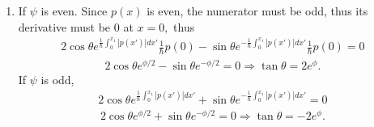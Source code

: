 \begin{enumerate}
    For $x<x_1,$ use the large approximation
    \begin{align*}
        \psi(x)=
        \frac{a}{2\sqrt{\pi}(\alpha(x-x_1))^{1/4}}e^{-\frac{2}{3}(\alpha(x-x_1))^{3/2}}+
        \frac{b}{\sqrt{\pi}(\alpha(x-x_1))^{1/4}}e^{\frac{2}{3}(\alpha(x-x_1))^{3/2}}
    \end{align*}
    \begin{align*}
        \frac{a}{2\sqrt{\pi}(\alpha(x-x_1))^{1/4}} = \frac{A}{\sqrt{\hbar}(-\alpha)^{3/4}(x_1-x)^{1/4}}
        \Rightarrow
        A =\frac{a\sqrt{\hbar}(-\alpha)^{1/2}}{2\sqrt{\pi}}
    \end{align*}
    \begin{align*}
        \frac{b}{\sqrt{\pi}(\alpha(x_1-x))^{1/4}} = \frac{B}{\sqrt{\hbar}(-\alpha)^{3/4}(x-x_1)^{1/4}}
        \Rightarrow 
        B = \frac{b\sqrt{\hbar}(-\alpha)^{1/2}}{\sqrt{\pi}}
    \end{align*}
    \begin{align*}
        A = D\sin\theta,\;
        B = 2D\cos\theta.
    \end{align*}
    Thus, for part iii
    \begin{align*}
        \psi(x)
        =\frac{D}{\sqrt{|p(x)|}}[\sin\theta e^{-\frac{1}{\hbar}\int_x^{x_1}|p(x')|dx'}+2\cos\theta e^{\frac{1}{\hbar}\int_x^{x_1}|p(x')|dx'}].
    \end{align*}
    \item 
    If $\psi$ is even.
    Since $p(x)$ is even, the numerator must be odd, thus its derivative must be 0 at $x=0,$ thus
    \begin{align*}
        2\cos\theta e^{\frac{1}{\hbar}\int_0^{x_1}|p(x')|dx'}
        \frac{1}{\hbar}p(0)
        -
        \sin\theta e^{-\frac{1}{\hbar}
        \int_0^{x_1}|p(x')|dx'}
        \frac{1}{\hbar}
        p(0)=0
    \end{align*}
    \begin{align*}
        2\cos\theta e^{\phi/2}
        -\sin\theta e^{-\phi/2}=0\Rightarrow
        \tan\theta = 2e^\phi.
    \end{align*}
    If $\psi$ is odd,
    \begin{align*}
        2\cos\theta e^{\frac{1}{\hbar}\int_0^{x_1}|p(x')|dx'}
        +
        \sin\theta e^{-\frac{1}{\hbar}
        \int_0^{x_1}|p(x')|dx'}=0
    \end{align*}
    \begin{align*}
        2\cos\theta e^{\phi/2}
        +\sin\theta e^{-\phi/2}=0\Rightarrow
        \tan\theta = -2e^\phi.
    \end{align*}

\end{enumerate}
